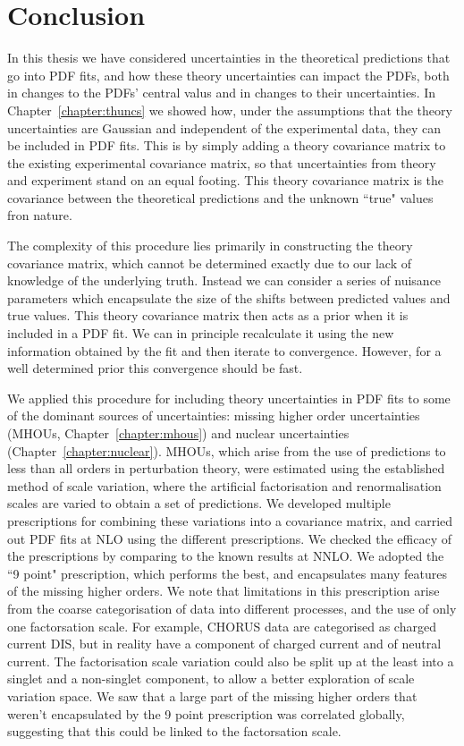 \chapter{Conclusion}

In this thesis we have considered uncertainties in the theoretical predictions that go into PDF fits, and how these theory uncertainties can impact the PDFs, both in changes to the PDFs' central valus and in changes to their uncertainties. In Chapter~\ref{chapter:thuncs} we showed how, under the assumptions that the theory uncertainties are Gaussian and independent of the experimental data, they can be included in PDF fits. This is by simply adding a theory covariance matrix to the existing experimental covariance matrix, so that uncertainties from theory and experiment stand on an equal footing. This theory covariance matrix is the covariance between the theoretical predictions and the unknown ``true" values fron nature.

The complexity of this procedure lies primarily in constructing the theory covariance matrix, which cannot be determined exactly due to our lack of knowledge of the underlying truth. Instead we can consider a series of nuisance parameters which encapsulate the size of the shifts between predicted values and true values. This theory covariance matrix then acts as a prior when it is included in a PDF fit. We can in principle recalculate it using the new information obtained by the fit and then iterate to convergence. However, for a well determined prior this convergence should be fast. 

We applied this procedure for including theory uncertainties in PDF fits to some of the dominant sources of uncertainties: missing higher order uncertainties (MHOUs, Chapter~\ref{chapter:mhous}) and nuclear uncertainties (Chapter~\ref{chapter:nuclear}). MHOUs, which arise from the use of predictions to less than all orders in perturbation theory, were estimated using the established method of scale variation, where the artificial factorisation and renormalisation scales are varied to obtain a set of predictions. We developed multiple prescriptions for combining these variations into a covariance matrix, and carried out PDF fits at NLO using the different prescriptions. We checked the efficacy of the prescriptions by comparing to the known results at NNLO. We adopted the ``9 point" prescription, which performs the best, and encapsulates many features of the missing higher orders. We note that limitations in this prescription arise from the  coarse categorisation of data into different processes, and the use of only one factorsation scale. For example, CHORUS data are categorised as charged current DIS, but in reality have a component of charged current and of neutral current. The factorisation scale variation could also be split up at the least into a singlet and a non-singlet component, to allow a better exploration of scale variation space. We saw that a large part of the missing higher orders that weren't encapsulated by the 9 point prescription was correlated globally, suggesting that this could be linked to the factorsation scale.


